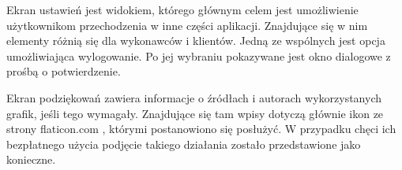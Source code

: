 Ekran ustawień jest widokiem, którego głównym celem jest umożliwienie użytkownikom przechodzenia w inne części aplikacji. Znajdujące się w nim elementy różnią się dla wykonawców i klientów. Jedną ze wspólnych jest opcja umożliwiająca wylogowanie. Po jej wybraniu pokazywane jest okno dialogowe z prośbą o potwierdzenie.

Ekran podziękowań zawiera informacje o źródłach i autorach wykorzystanych grafik, jeśli tego wymagały. Znajdujące się tam wpisy dotyczą głównie ikon ze strony flaticon.com \cite{flaticon}, którymi postanowiono się posłużyć. W przypadku chęci ich bezpłatnego użycia podjęcie takiego działania zostało przedstawione jako konieczne.